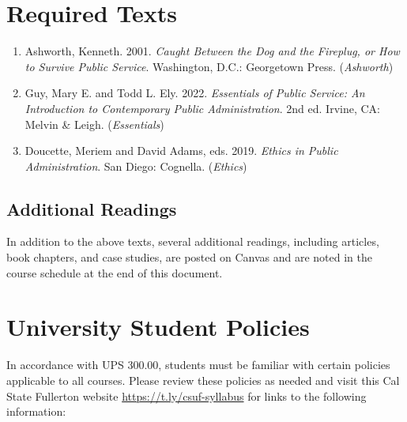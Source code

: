 \documentclass[10pt, letterpaper]{article}
\begin{document}
\section*{Required Texts}

\begin{enumerate}
    \item Ashworth, Kenneth. 2001. \emph{Caught Between the Dog and the Fireplug, or How to Survive Public Service}. Washington, D.C.: Georgetown Press. (\textit{Ashworth})
    \item Guy, Mary E. and Todd L. Ely. 2022. \emph{Essentials of Public Service: An Introduction to Contemporary Public Administration}. 2nd ed. Irvine, CA: Melvin \& Leigh. (\textit{Essentials})
    \item Doucette, Meriem and David Adams, eds. 2019. \emph{Ethics in Public Administration}. San Diego: Cognella. (\textit{Ethics})
\end{enumerate}

\subsection*{Additional Readings}

In addition to the above texts, several additional readings, including articles, book chapters, and case studies, are posted on Canvas and are noted in the course schedule at the end of this document. 


\section*{University Student Policies}

In accordance with UPS 300.00, students must be familiar with certain policies applicable to all courses. Please review these policies as needed and visit this Cal State Fullerton website \href{https://t.ly/csuf-syllabus}{https://t.ly/csuf-syllabus} for links to the following information:
\end{document}
